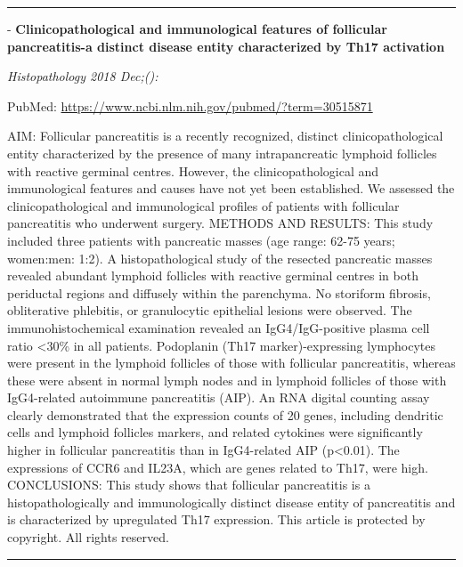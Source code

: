 \documentclass[]{article}
\begin{document}
{}

{}

\begin{center}\rule{0.5\linewidth}{\linethickness}\end{center}

 - \textbf{Clinicopathological and immunological features of follicular
pancreatitis-a distinct disease entity characterized by Th17 activation}

\emph{Histopathology 2018 Dec;():}

PubMed: \url{https://www.ncbi.nlm.nih.gov/pubmed/?term=30515871}

AIM: Follicular pancreatitis is a recently recognized, distinct
clinicopathological entity characterized by the presence of many
intrapancreatic lymphoid follicles with reactive germinal centres.
However, the clinicopathological and immunological features and causes
have not yet been established. We assessed the clinicopathological and
immunological profiles of patients with follicular pancreatitis who
underwent surgery. METHODS AND RESULTS: This study included three
patients with pancreatic masses (age range: 62-75 years; women:men:
1:2). A histopathological study of the resected pancreatic masses
revealed abundant lymphoid follicles with reactive germinal centres in
both periductal regions and diffusely within the parenchyma. No
storiform fibrosis, obliterative phlebitis, or granulocytic epithelial
lesions were observed. The immunohistochemical examination revealed an
IgG4/IgG-positive plasma cell ratio \textless{}30\% in all patients.
Podoplanin (Th17 marker)-expressing lymphocytes were present in the
lymphoid follicles of those with follicular pancreatitis, whereas these
were absent in normal lymph nodes and in lymphoid follicles of those
with IgG4-related autoimmune pancreatitis (AIP). An RNA digital counting
assay clearly demonstrated that the expression counts of 20 genes,
including dendritic cells and lymphoid follicles markers, and related
cytokines were significantly higher in follicular pancreatitis than in
IgG4-related AIP (p\textless{}0.01). The expressions of CCR6 and IL23A,
which are genes related to Th17, were high. CONCLUSIONS: This study
shows that follicular pancreatitis is a histopathologically and
immunologically distinct disease entity of pancreatitis and is
characterized by upregulated Th17 expression. This article is protected
by copyright. All rights reserved.

{}

{}

\begin{center}\rule{0.5\linewidth}{\linethickness}\end{center}
\end{document}

